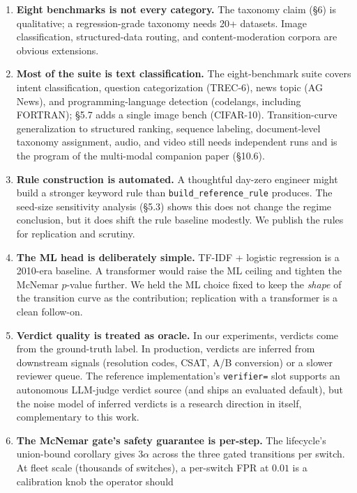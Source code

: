 \begin{enumerate}
\def\labelenumi{\arabic{enumi}.}
\item
  \textbf{Eight benchmarks is not every category.} The taxonomy claim
  (§6) is qualitative; a regression-grade taxonomy needs 20+ datasets.
  Image classification, structured-data routing, and content-moderation
  corpora are obvious extensions.
\item
  \textbf{Most of the suite is text classification.} The eight-benchmark
  suite covers intent classification, question categorization (TREC-6),
  news topic (AG News), and programming-language detection (codelangs,
  including FORTRAN); §5.7 adds a single image bench (CIFAR-10).
  Transition-curve generalization to structured ranking, sequence
  labeling, document-level taxonomy assignment, audio, and video still
  needs independent runs and is the program of the multi-modal companion
  paper (§10.6).
\item
  \textbf{Rule construction is automated.} A thoughtful day-zero
  engineer might build a stronger keyword rule than
  \texttt{build\_reference\_rule} produces. The seed-size sensitivity
  analysis (§5.3) shows this does not change the regime conclusion, but
  it does shift the rule baseline modestly. We publish the rules for
  replication and scrutiny.
\item
  \textbf{The ML head is deliberately simple.} TF-IDF + logistic
  regression is a 2010-era baseline. A transformer would raise the ML
  ceiling and tighten the McNemar \(p\)-value further. We held the ML
  choice fixed to keep the \emph{shape} of the transition curve as the
  contribution; replication with a transformer is a clean follow-on.
\item
  \textbf{Verdict quality is treated as oracle.} In our experiments,
  verdicts come from the ground-truth label. In production, verdicts are
  inferred from downstream signals (resolution codes, CSAT, A/B
  conversion) or a slower reviewer queue. The reference implementation's
  \texttt{verifier=} slot supports an autonomous LLM-judge verdict
  source (and ships an evaluated default), but the noise model of
  inferred verdicts is a research direction in itself, complementary to
  this work.
\item
  \textbf{The McNemar gate's safety guarantee is per-step.} The
  lifecycle's union-bound corollary gives \(3\alpha\) across the three
  gated transitions per switch. At fleet scale (thousands of switches),
  a per-switch FPR at \(0.01\) is a calibration knob the operator should

\end{enumerate}
